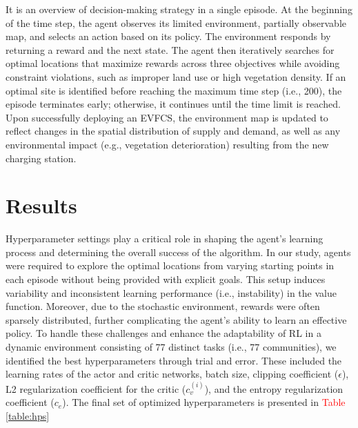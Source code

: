 \documentclass[preprint,12pt]{elsarticle}
\begin{document}
It is an overview of decision-making strategy in a single episode. At the beginning of the time step, the agent observes its limited environment, partially observable map, and selects an action based on its policy. The environment responds by returning a reward and the next state. The agent then iteratively searches for optimal locations that maximize rewards across three objectives while avoiding constraint violations, such as improper land use or high vegetation density. If an optimal site is identified before reaching the maximum time step (i.e., 200), the episode terminates early; otherwise, it continues until the time limit is reached. Upon successfully deploying an EVFCS, the environment map is updated to reflect changes in the spatial distribution of supply and demand, as well as any environmental impact (e.g., vegetation deterioration) resulting from the new charging station. 

\section{Results}
Hyperparameter settings play a critical role in shaping the agent's learning process and determining the overall success of the algorithm. In our study, agents were required to explore the optimal locations 
from varying starting points in each episode without being provided with explicit goals. This setup induces variability and inconsistent learning performance (i.e., instability) in the value function. Moreover, due to the stochastic environment, rewards were often sparsely distributed, further complicating the agent's ability to learn an effective policy. To handle these challenges and enhance the adaptability of RL in a dynamic environment consisting of 77 distinct tasks (i.e., 77 communities), we identified the best hyperparameters through trial and error. These included the learning rates of the actor and critic networks, batch size, clipping coefficient ($\epsilon$), L2 regularization coefficient for the critic ($c_v^{(i)}$), and the entropy regularization coefficient ($c_e$). The final set of optimized hyperparameters is presented in \textcolor{red}{Table} \ref{table:hps}
\end{document}
